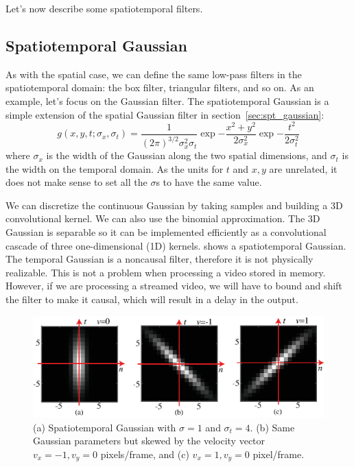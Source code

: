 Let's now describe some spatiotemporal filters. 


\subsection{Spatiotemporal Gaussian}

As with the spatial case, we can define the same low-pass filters in the spatiotemporal domain: the box filter, triangular filters, and so on.  As an example, let's focus on the Gaussian filter. The spatiotemporal Gaussian is a simple extension of the spatial Gaussian filter in section~\ref{sec:spt_gaussian}:
\begin{equation}
g(x,y,t; \sigma_x,\sigma_t) = \frac{1}{(2 \pi)^{3/2} \sigma_x^2\sigma_t} \exp{-\frac{x^2 +
   y^2}{2 \sigma_x^2}} \exp{-\frac{t^2}{2 \sigma_t^2}}
\label{eq:gauss3dcont}
\end{equation}
where $\sigma_x$ is the width of the Gaussian along the two spatial dimensions, and $\sigma_t$ is the width on the temporal domain. As the units for $t$ and $x,y$ are unrelated, it does not make sense to set all the $\sigma$s to have the same value. 

We can discretize the continuous Gaussian by taking samples and building a 3D convolutional kernel. We can also use the binomial approximation. The 3D Gaussian is separable so it can be implemented efficiently as a convolutional cascade of three one-dimensional (1D) kernels.  shows a spatiotemporal Gaussian. The temporal Gaussian is a noncausal filter, therefore it is not physically realizable. This is not a problem when processing a video stored in memory. However, if we are processing a streamed video, we will have to bound and shift the filter to make it causal, which will result in a delay in the output. 


\begin{figure}[t]
\includegraphics[width=1\linewidth]{figures/temporal_filters/seq_filtered_kernel.eps}
\caption{(a) Spatiotemporal Gaussian with $\sigma=1$ and $\sigma_t=4$.  (b) Same Gaussian parameters but skewed by the velocity vector $v_x=-1, v_y=0$ pixels/frame, and (c) $v_x=1, v_y=0$ pixel/frame.} 
\label{fig:seq_filtered_kernel}
\end{figure}


